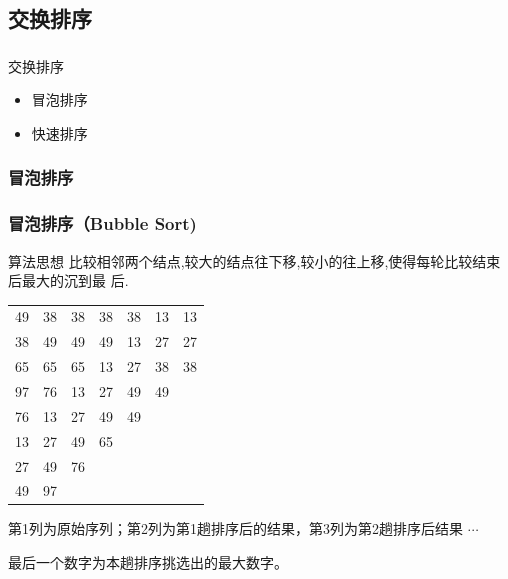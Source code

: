 \subsection{交换排序}
\begin{frame}[fragile]
  \frametitle{}
  \begin{sectionbox}{交换排序}
    \begin{itemize}
    \item 冒泡排序
    \item 快速排序
    \end{itemize}
  \end{sectionbox}
\end{frame}

\subsubsection{冒泡排序}
\begin{frame}
  \frametitle{冒泡排序（Bubble Sort)}
  \begin{infobox}{算法思想}
    比较相邻两个结点,较大的结点往下移,较小的往上移,使得每轮比较结束后最大的沉到最
    后.
  \end{infobox}

  \newpage
  
  \begin{center}
    \begin{tabular}{|p{0.6cm}|p{0.6cm}|p{0.6cm}|p{0.6cm}|p{0.6cm}|p{0.6cm}|p{0.6cm}|}
      \hline
      49 & 38 & 38 & 38 & 38 & 13 & \cellcolor{red!15} 13 \\
      38 & 49 & 49 & 49 & 13 & 27 & \cellcolor{red!15} 27 \\
      65 & 65 & 65 & 13 & 27 & 38 & \cellcolor{red!15} 38 \\
      97 & 76 & 13 & 27 & 49 & \cellcolor{red!15} 49 & ~ \\
      76 & 13 & 27 & 49 & \cellcolor{red!15} 49 & ~  & ~ \\
      13 & 27 & 49 & \cellcolor{red!15}  65 &    &    &   \\
      27 & 49 & \cellcolor{red!15}  76 &    &    &    &   \\
      49 & \cellcolor{red!15} 97 &    &    &    &    &   \\
      \hline  
    \end{tabular}
  \end{center}
  第1列为原始序列；第2列为第1趟排序后的结果，第3列为第2趟排序后结果 $\cdots$

  最后一个数字为本趟排序挑选出的最大数字。
\end{frame}

